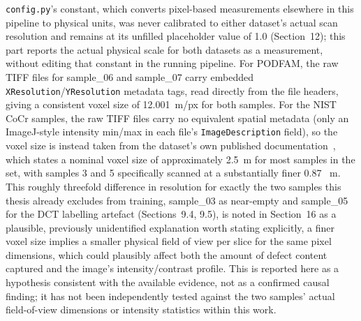 \texttt{config.py}'s  constant, which converts pixel-based measurements
elsewhere in this pipeline to physical units, was never calibrated to either dataset's actual scan
resolution and remains at its unfilled placeholder value of 1.0 (Section~12); this part reports the
actual physical scale for both datasets as a measurement, without editing that constant in the running
pipeline. For PODFAM, the raw TIFF files for sample\_06 and sample\_07 carry embedded
\texttt{XResolution}/\texttt{YResolution} metadata tags, read directly from the file headers, giving a
consistent voxel size of 12.001~\textmu m/px for both samples. For the NIST CoCr samples, the raw TIFF
files carry no equivalent spatial metadata (only an ImageJ-style intensity min/max in each file's
\texttt{ImageDescription} field), so the voxel size is instead taken from the dataset's own published
documentation~\citep{NIST_CoCr}, which states a nominal voxel size of approximately 2.5~\textmu m for
most samples in the set, with samples 3 and 5 specifically scanned at a substantially finer 0.87~\textmu
m. This roughly threefold difference in resolution for exactly the two samples this thesis already
excludes from training, sample\_03 as near-empty and sample\_05 for the DCT labelling artefact
(Sections~9.4, 9.5), is noted in Section~16 as a plausible, previously unidentified explanation worth
stating explicitly, a finer voxel size implies a smaller physical field of view per slice for the same
pixel dimensions, which could plausibly affect both the amount of defect content captured and the
image's intensity/contrast profile. This is reported here as a hypothesis consistent with the
available evidence, not as a confirmed causal finding; it has not been independently tested against
the two samples' actual field-of-view dimensions or intensity statistics within this work.
